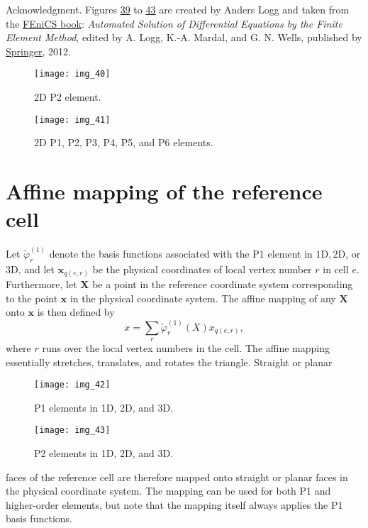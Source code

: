 \documentclass[../main.tex]{subfiles}
\begin{document}
Acknowledgment. Figures \hyperref[fig:img_39]{39} to \hyperref[fig:img_43]{43} are created by Anders Logg and taken
from the \href{https://launchpad.net/fenics-book}{FEniCS book}: \textit{Automated Solution of Differential Equations by the
Finite Element Method}, edited by A. Logg, K.-A. Mardal, and G. N. Wells,
published by \href{https://link.springer.com/book/10.1007/978-3-642-23099-8}{Springer}, 2012.
\begin{figure}[H]
	\centering
	\texttt{[image: img\_40]}
	\caption{2D P2 element.}
	\label{fig:img_40}
\end{figure}
\begin{figure}[H]
	\centering
	\texttt{[image: img\_41]}
	\caption{2D P1, P2, P3, P4, P5, and P6 elements.}
	\label{fig:img_41}
\end{figure}
\section[Affine mapping of the reference cell]{Affine mapping of the reference cell}
\label{sec:sec_9_3}
\noindent Let $\tilde{\varphi}_{r}^{(1)}$ denote the basis functions associated with the $\mathrm{P} 1$ element in $1 \mathrm{D}, 2 \mathrm{D}$, or 3D, and let $\boldsymbol{x}_{q(e, r)}$ be the physical coordinates of local vertex number $r$ in cell $e$. Furthermore, let $\boldsymbol{X}$ be a point in the reference coordinate system corresponding to the point $\boldsymbol{x}$ in the physical coordinate system. The affine mapping of any $\boldsymbol{X}$ onto $\boldsymbol{x}$ is then defined by
\begin{equation}\label{eqa112}
	x=\sum_{r} \tilde{\varphi}_{r}^{(1)}(X) x_{q(e, r)},
\end{equation}
where $r$ runs over the local vertex numbers in the cell. The affine mapping essentially stretches, translates, and rotates the triangle. Straight or planar
\begin{figure}[H]
	\centering
	\texttt{[image: img\_42]}
	\caption{P1 elements in 1D, 2D, and 3D.}
	\label{fig:img_42}
\end{figure}
\begin{figure}[H]
	\centering
	\texttt{[image: img\_43]}
	\caption{P2 elements in 1D, 2D, and 3D.}
	\label{fig:img_43}
\end{figure}

\noindent faces of the reference cell are therefore mapped onto straight or planar faces
in the physical coordinate system. The mapping can be used for both P1 and
higher-order elements, but note that the mapping itself always applies the P1
basis functions.
\end{document}
